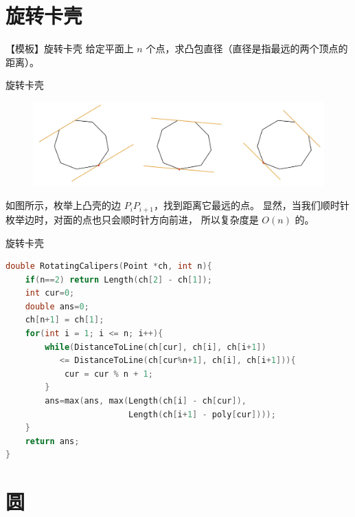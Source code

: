 \documentclass{beamer}
\begin{document}
\section{旋转卡壳}

\begin{frame}{【模板】旋转卡壳}
    \small
    给定平面上 $n$ 个点，求凸包直径（直径是指最远的两个顶点的距离）。
\end{frame}

\begin{frame}{旋转卡壳}
    \small
    \begin{figure}[H]
        \centering
        \includegraphics[width=\textwidth]{pic/rotation.jpg}
    \end{figure}
    如图所示，枚举上凸壳的边 $P_iP_{i+1}$，找到距离它最远的点。
    显然，当我们顺时针枚举边时，对面的点也只会顺时针方向前进，
    所以复杂度是 $O(n)$ 的。
\end{frame}

\begin{frame}[fragile]{旋转卡壳}
    \small
    \begin{lstlisting}[language=c++]
double RotatingCalipers(Point *ch, int n){
    if(n==2) return Length(ch[2] - ch[1]);
    int cur=0;
    double ans=0;
    ch[n+1] = ch[1];
    for(int i = 1; i <= n; i++){
        while(DistanceToLine(ch[cur], ch[i], ch[i+1]) 
           <= DistanceToLine(ch[cur%n+1], ch[i], ch[i+1])){
            cur = cur % n + 1;
        }
        ans=max(ans, max(Length(ch[i] - ch[cur]), 
                         Length(ch[i+1] - poly[cur])));
    }
    return ans;
}
    \end{lstlisting}
\end{frame}

\section{圆}
\end{document}

